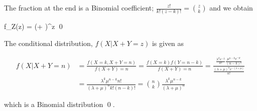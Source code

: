 The fraction at the end is a Binomial coefficient; $\frac{z!}{k!(z-k)!} = {z \choose k}$ and we obtain

\bee
f_Z(z) =  (\lambda + \mu)^z \qed
\eee

The conditional distribution, $f(X|X+Y=z)$ is given as

\begin{align*}
f(X|X+Y=n) &= \frac{f(X=k, X+Y=n)}{f(X+Y)=n} = \frac{f(X=k) f(Y = n-k)}{f(X+Y)=n} = \frac{ \frac{\lambda^k e^{-\lambda} }{k!} \frac{\mu^{n-k} e^{-\mu} }{(n-k)!} }{ \frac{(\lambda + \mu)^n e^{-(\lambda+\mu)}}{n!} } \\ &= \frac{\lambda^k \mu^{n-k} n!}{(\lambda+\mu)^n k! (n-k)!} = {n \choose k} \frac{\lambda^k \mu^{n-k}}{(\lambda+\mu)^n}
\end{align*}

which is a Binomial distribution \qed.

